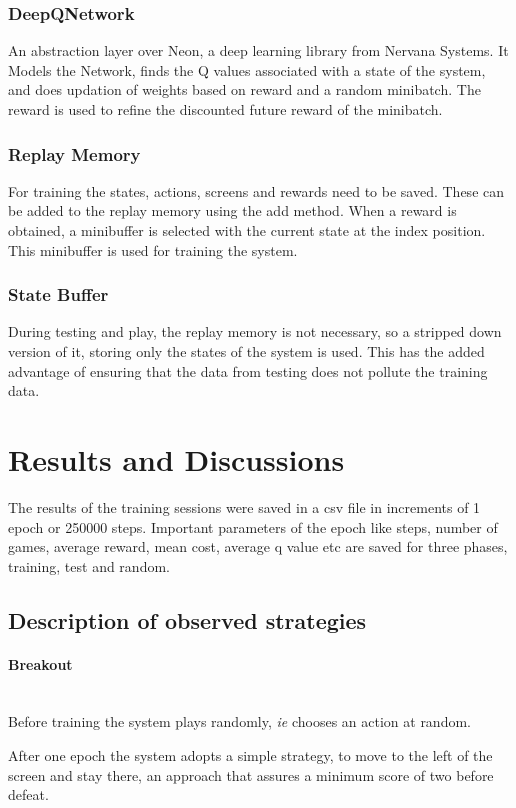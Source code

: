 \documentclass[a4paper,11pt]{article}
\newcommand{\mparagraph}[1]{\paragraph{#1}\mbox{}\\}
\begin{document}
			\subsubsection{DeepQNetwork}
				An abstraction layer over Neon, a deep learning library from Nervana Systems. It Models the Network, finds the Q values associated with a state of the system, and does updation of weights based on reward and a random minibatch. The reward is used to refine the discounted future reward of the minibatch.

			\subsubsection{Replay Memory}
				For training the states, actions, screens and rewards need to be saved. These can be added to the replay memory using the add method. When a reward is obtained, a minibuffer is selected with the current state at the index position. This minibuffer is used for training the system.

			\subsubsection{State Buffer}
				During testing and play, the replay memory is not necessary, so a stripped down version of it, storing only the states of the system is used. This has the added advantage of ensuring that the data from testing does not pollute the training data.

	\section{Results and Discussions}
		The results of the training sessions were saved in a csv file in increments of 1 epoch or 250000 steps. Important parameters of the epoch like steps, number of games, average reward, mean cost, average q value etc are saved for three phases, training, test and random.


		\subsection{Description of observed strategies}
			\mparagraph{Breakout}
				Before training the system plays randomly, \emph{ie} chooses an action at random. 

				After one epoch the system adopts a simple strategy, to move to the left of the screen and stay there, an approach that assures a minimum score of two before defeat.
\end{document}
